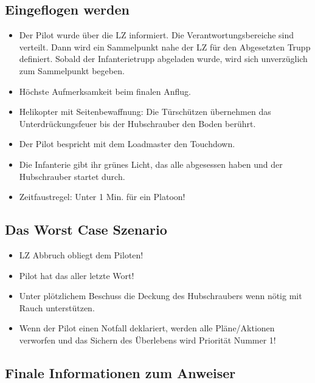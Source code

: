 \subsection{Eingeflogen werden}
	\begin{itemize} 
		\item Der Pilot wurde über die LZ informiert. Die Verantwortungsbereiche sind verteilt. Dann wird ein Sammelpunkt nahe der LZ für den Abgesetzten Trupp definiert. Sobald der Infanterietrupp abgeladen wurde, wird sich unverzüglich zum Sammelpunkt begeben.

		\item Höchste Aufmerksamkeit beim finalen Anflug.

		\item Helikopter mit Seitenbewaffnung: Die Türschützen übernehmen das Unterdrückungsfeuer bis der Hubschrauber den Boden berührt.

		\item Der Pilot bespricht mit dem Loadmaster den Touchdown.

		\item Die Infanterie gibt ihr grünes Licht, das alle abgesessen haben und der Hubschrauber startet durch.

		\item Zeitfaustregel: Unter 1 Min. für ein Platoon!
	\end{itemize}

\subsection{Das Worst Case Szenario}
	\begin{itemize}
		\item LZ Abbruch obliegt dem Piloten!

		\item Pilot hat das aller letzte Wort!

		\item Unter plötzlichem Beschuss die Deckung des Hubschraubers wenn nötig mit Rauch unterstützen.

		\item Wenn der Pilot einen Notfall deklariert, werden alle Pläne/Aktionen verworfen und das Sichern des Überlebens wird Priorität Nummer 1!

	\end{itemize}

\subsection{Finale Informationen zum Anweiser}

